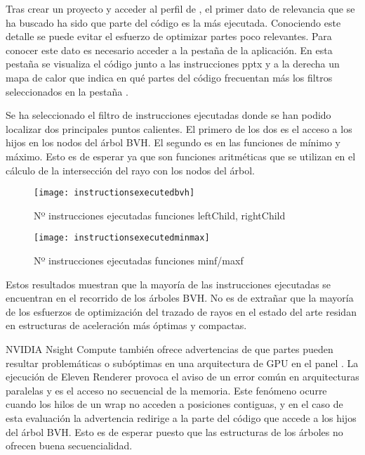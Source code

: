 Tras crear un proyecto y acceder al perfil de , el primer dato de relevancia que se ha buscado ha sido que parte del código es la más ejecutada. Conociendo este detalle se puede evitar el esfuerzo de optimizar partes poco relevantes. Para conocer este dato es necesario acceder a la pestaña  de la aplicación. En esta pestaña se visualiza el código junto a las instrucciones pptx y a la derecha un mapa de calor que indica en qué partes del código frecuentan más los filtros seleccionados en la pestaña .

Se ha seleccionado el filtro de instrucciones ejecutadas donde se han podido localizar dos principales puntos calientes. El primero de los dos es el acceso a los hijos en los nodos del árbol BVH. El segundo es en las funciones de mínimo y máximo. Esto es de esperar ya que son funciones aritméticas que se utilizan en el cálculo de la intersección del rayo con los nodos del árbol.

\begin{figure}[H]
    \centering
	\texttt{[image: instructionsexecutedbvh]}
	\caption{Nº instrucciones ejecutadas funciones leftChild, rightChild}
	\label{fig:label}
\end{figure}

\begin{figure}[H]
    \centering
	\texttt{[image: instructionsexecutedminmax]}
	\caption{Nº instrucciones ejecutadas funciones minf/maxf}
	\label{fig:label}
\end{figure}

Estos resultados muestran que la mayoría de las instrucciones ejecutadas se encuentran en el recorrido de los árboles BVH. No es de extrañar que la mayoría de los esfuerzos de optimización del trazado de rayos en el estado del arte residan en estructuras de aceleración más óptimas y compactas. 

NVIDIA Nsight Compute también ofrece advertencias de que partes pueden resultar problemáticas o subóptimas en una arquitectura de GPU en el panel . La ejecución de Eleven Renderer provoca el aviso de un error común en arquitecturas paralelas y es el acceso no secuencial de la memoria. Este fenómeno ocurre cuando los hilos de un wrap no acceden a posiciones contiguas, y en el caso de esta evaluación la advertencia redirige a la parte del código que accede a los hijos del árbol BVH. Esto es de esperar puesto que las estructuras de los árboles no ofrecen buena secuencialidad.

